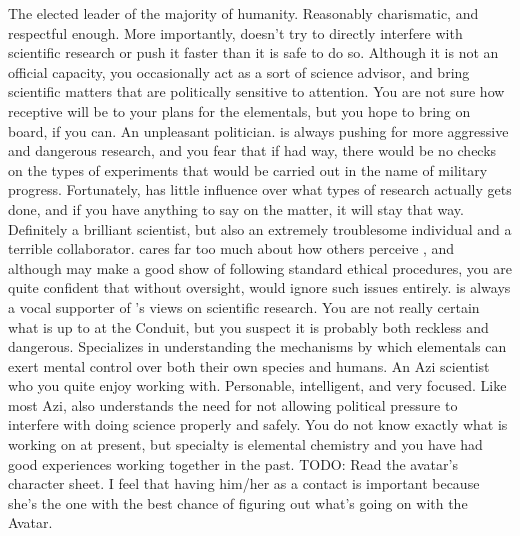 \documentclass[char]{guildcamp1}
\begin{document}
\begin{contacts}
  \contact{\cLeader{}} The elected leader of the majority of humanity. Reasonably charismatic, and respectful enough. More importantly, \cLeader{\they} doesn't try to directly interfere with scientific research or push it faster than it is safe to do so. Although it is not an official capacity, you occasionally act as a sort of science advisor, and bring scientific matters that are politically sensitive to \cLeader{\their} attention. You are not sure how receptive \cLeader{\they} will be to your plans for the elementals, but you hope to bring \cLeader{\them} on board, if you can.
	\contact{\cDema{}} An unpleasant politician. \cDema{\They} is always pushing for more aggressive and dangerous research, and you fear that if \cDema{\they} had \cDema{\their} way, there would be no checks on the types of experiments that would be carried out in the name of military progress. Fortunately, \cDema{\they} has little influence over what types of research actually gets done, and if you have anything to say on the matter, it will stay that way.
	\contact{\cMS{}} Definitely a brilliant scientist, but also an extremely troublesome individual and a terrible collaborator. \cMS{\They} cares far too much about how others perceive \cMS{\them}, and although \cMS{\they} may make a good show of following standard ethical procedures, you are quite confident that without oversight, \cMS{\they} would ignore such issues entirely. \cMS{\They} is always a vocal supporter of \cDema{}'s views on scientific research. You are not really certain what \cMS{\they} is up to at the Conduit, but you suspect it is probably both reckless and dangerous. Specializes in understanding the mechanisms by which elementals can exert mental control over both their own species and humans.
	\contact{\cScientist{}} An Azi scientist who you quite enjoy working with. Personable, intelligent, and very focused. Like most Azi, \cScientist{\they} also understands the need for not allowing political pressure to interfere with doing science properly and safely. You do not know exactly what \cScientist{\they} is working on at present, but \cScientist{\their} specialty is elemental chemistry and you have had good experiences working together in the past.
  \contact{\cAvatar{}} TODO: Read the avatar's character sheet. I feel that having him/her as a contact is important because she's the one with the best chance of figuring out what's going on with the Avatar.
\end{contacts}
\end{document}
